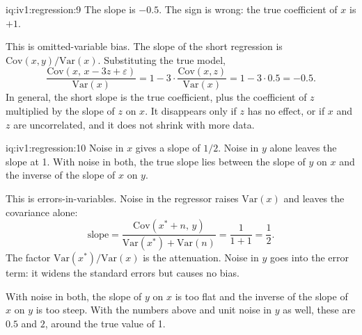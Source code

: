 \begin{solution}{iq:iv1:regression:9}
The slope is $-0.5$. The sign is wrong: the true coefficient of $x$ is $+1$.

This is omitted-variable bias. The slope of the short regression is $\mathrm{Cov}(x, y)/\mathrm{Var}(x)$. Substituting the true model,
\[
\frac{\mathrm{Cov}(x,\, x - 3z + \varepsilon)}{\mathrm{Var}(x)} = 1 - 3 \cdot \frac{\mathrm{Cov}(x, z)}{\mathrm{Var}(x)} = 1 - 3 \cdot 0.5 = -0.5 .
\]
In general, the short slope is the true coefficient, plus the coefficient of $z$ multiplied by the slope of $z$ on $x$. It disappears only if $z$ has no effect, or if $x$ and $z$ are uncorrelated, and it does not shrink with more data.

\end{solution}

\begin{solution}{iq:iv1:regression:10}
Noise in $x$ gives a slope of $1/2$. Noise in $y$ alone leaves the slope at 1. With noise in both, the true slope lies between the slope of $y$ on $x$ and the inverse of the slope of $x$ on $y$.

This is errors-in-variables. Noise in the regressor raises $\mathrm{Var}(x)$ and leaves the covariance alone:
\[
\text{slope} = \frac{\mathrm{Cov}(x^* + n,\, y)}{\mathrm{Var}(x^*) + \mathrm{Var}(n)} = \frac{1}{1 + 1} = \frac12 .
\]
The factor $\mathrm{Var}(x^*)/\mathrm{Var}(x)$ is the attenuation. Noise in $y$ goes into the error term: it widens the standard errors but causes no bias.

With noise in both, the slope of $y$ on $x$ is too flat and the inverse of the slope of $x$ on $y$ is too steep. With the numbers above and unit noise in $y$ as well, these are $0.5$ and $2$, around the true value of 1.

\end{solution}

